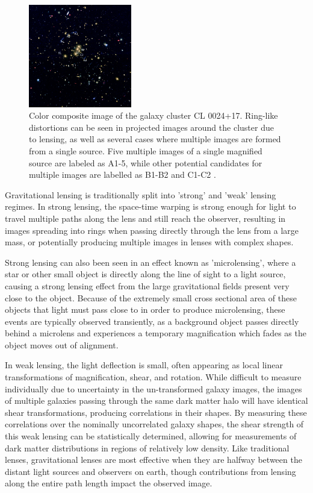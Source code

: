\begin{figure}
	\label{fig:gravLensing}
	\centering
	\includegraphics[width=0.4\textwidth]{figures/grav_lensing.jpg}
	\caption[Gravitational lensing of galaxy cluster CL0024+17]{ Color composite image of the galaxy cluster CL 0024+17. Ring-like distortions can be seen in projected images around the cluster due to lensing, as well as several cases where multiple images are formed from a single source. Five multiple images of a single magnified source are labeled as A1-5, while other potential candidates for multiple images are labelled as B1-B2 and C1-C2 \cite{jee2007}.}
\end{figure}

Gravitational lensing is traditionally split into 'strong' and 'weak' lensing regimes. 
In strong lensing, the space-time warping is strong enough for light to travel multiple paths along the lens and still reach the observer, resulting in images spreading into rings when passing directly through the lens from a large mass, or potentially producing multiple images in lenses with complex shapes.

Strong lensing can also been seen in an effect known as 'microlensing', where a star or other small object is directly along the line of sight to a light source, causing a strong lensing effect from the large gravitational fields present very close to the object.
Because of the extremely small cross sectional area of these objects that light must pass close to in order to produce microlensing, these events are typically observed transiently, as a background object passes directly behind a microlens and experiences a temporary magnification which fades as the object moves out of alignment. 

In weak lensing, the light deflection is small, often appearing as local linear transformations of magnification, shear, and rotation. 
While difficult to measure individually due to uncertainty in the un-transformed galaxy images, the images of multiple galaxies passing through the same dark matter halo will have identical shear transformations, producing correlations in their shapes.
By measuring these correlations over the nominally uncorrelated galaxy shapes, the shear strength of this weak lensing can be statistically determined, allowing for measurements of dark matter distributions in regions of relatively low density.
Like traditional lenses, gravitational lenses are most effective when they are halfway between the distant light sources and observers on earth, though contributions from lensing along the entire path length impact the observed image.

